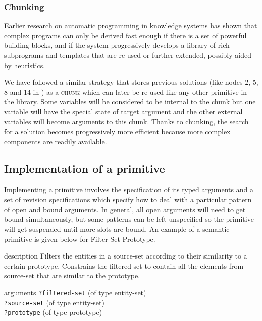 \subsubsection{Chunking}
\label{s:irl-chunking}

Earlier research on automatic programming in knowledge systems
\citep[see e.g.][]{barstow79knowledge} has shown that complex programs
can only be derived fast enough if there is a set of powerful building
blocks, and if the system progressively develops a library of rich
subprograms and templates that are re-used or further extended,
possibly aided by heuristics.

We have followed a similar strategy that stores previous solutions
(like nodes 2, 5, 8 and 14 in ) as a
\textsc{chunk} which can later be re-used like any other primitive in
the library. Some variables will be considered to be internal to the
chunk but one variable will have the special state of target argument
and the other external variables will become arguments to this
chunk. Thanks to chunking, the search for a solution becomes
progressively more efficient because more complex components are
readily available.

\subsection{Implementation of a primitive}

Implementing a primitive involves the specification of its typed
arguments and a set of revision specifications which specify how to
deal with a particular pattern of open and bound arguments. In
general, all open arguments will need to get bound simultaneously, but
some patterns can be left unspecified so the primitive will get
suspended until more slots are bound. An example of a semantic
primitive is given below for {\sc Filter-Set-Prototype}.


\begin{explanation}{description}
  Filters the entities in a source-set according to their similarity
  to a certain prototype. Constrains the filtered-set to contain all
  the elements from source-set that are similar to the prototype.
\end{explanation}

\begin{explanation}{arguments}
\verb+?filtered-set+ (of type entity-set) \\
\verb+?source-set+ (of type entity-set) \\
\verb+?prototype+ (of type prototype)
\end{explanation}

